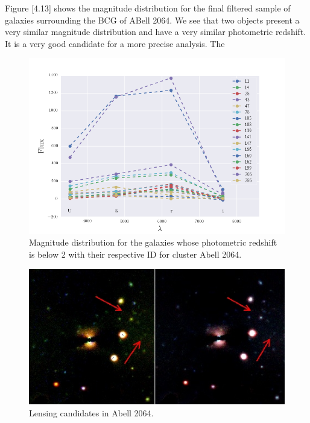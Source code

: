 Figure [4.13] shows the magnitude distribution for the final filtered sample of galaxies surrounding the BCG of ABell 2064. We see that two objects present a very similar magnitude distribution and have a very similar photometric redshift. It is a very good candidate for a more precise analysis. The 

\begin{figure}[H]
\centering
\includegraphics[width=15cm]{images/magnitude_distribution_A2064.png}
\caption[Magnitude distribution of galaxies in Abell 2064]{Magnitude distribution for the galaxies whose photometric redshift is below 2 with their respective ID for cluster Abell 2064.}
\end{figure}

\begin{figure}[H]
\centering
\includegraphics[width=15cm]{images/candidates.jpg}
\caption[Lensing candidates Abell 2064]{Lensing candidates in Abell 2064.}
\end{figure}